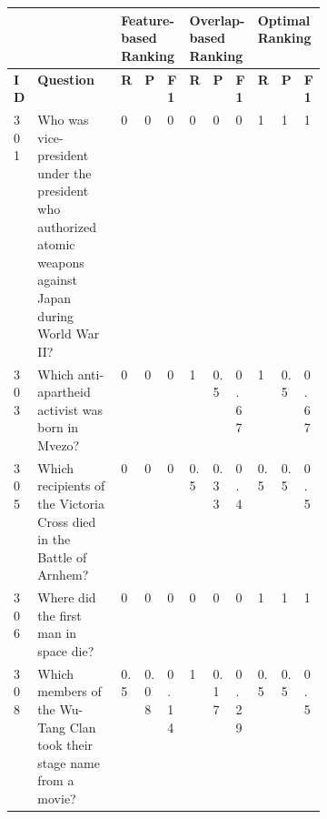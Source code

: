 \begin{longtable}{@{}lp{0.4\linewidth}lllllllll@{}}
\toprule
         &                                                                                                             & \multicolumn{3}{l}{{\bf Feature-based Ranking}}     & \multicolumn{3}{l}{{\bf Overlap-based Ranking}}                                   & \multicolumn{3}{l}{{\bf Optimal Ranking}}                                      \\ \midrule
{\bf ID} & {\bf Question}                                                                                              & {\bf R}                & {\bf P}              & {\bf F1}             & {\bf R}              & {\bf P}           & {\bf F1}          & {\bf R}             & {\bf P}          & {\bf F1}         \\\midrule
301      & Who was vice-president under the president who authorized atomic weapons against Japan during World War II? & \cellcolor[HTML]{FFFE65}0   & \cellcolor[HTML]{FFFE65}0    & \cellcolor[HTML]{FFFE65}0    & \cellcolor[HTML]{FFFE65}0 & \cellcolor[HTML]{FFFE65}0 & \cellcolor[HTML]{FFFE65}0 & 1                        & 1                        & 1                        \\
303      & Which anti-apartheid activist was born in Mvezo?                                                            & \cellcolor[HTML]{F8A102}0   & \cellcolor[HTML]{F8A102}0    & \cellcolor[HTML]{F8A102}0    & 1                         & 0.5                       & 0.67                      & 1                        & 0.5                      & 0.67                     \\
305      & Which recipients of the Victoria Cross died in the Battle of Arnhem?                                        & \cellcolor[HTML]{F8A102}0   & \cellcolor[HTML]{F8A102}0    & \cellcolor[HTML]{F8A102}0    & 0.5                       & 0.33                      & 0.4                       & 0.5                      & 0.5                      & 0.5                      \\
306      & Where did the first man in space die?                                                                       & \cellcolor[HTML]{FFFE65}0   & \cellcolor[HTML]{FFFE65}0    & \cellcolor[HTML]{FFFE65}0    & \cellcolor[HTML]{FFFE65}0 & \cellcolor[HTML]{FFFE65}0 & \cellcolor[HTML]{FFFE65}0 & 1                        & 1                        & 1                        \\
308      & Which members of the Wu-Tang Clan took their stage name from a movie?                                       & \cellcolor[HTML]{F8A102}0.5 & \cellcolor[HTML]{F8A102}0.08 & \cellcolor[HTML]{F8A102}0.14 & 1                         & 0.17                      & 0.29                      & 0.5                      & 0.5                      & 0.5                      \\

\end{longtable}
